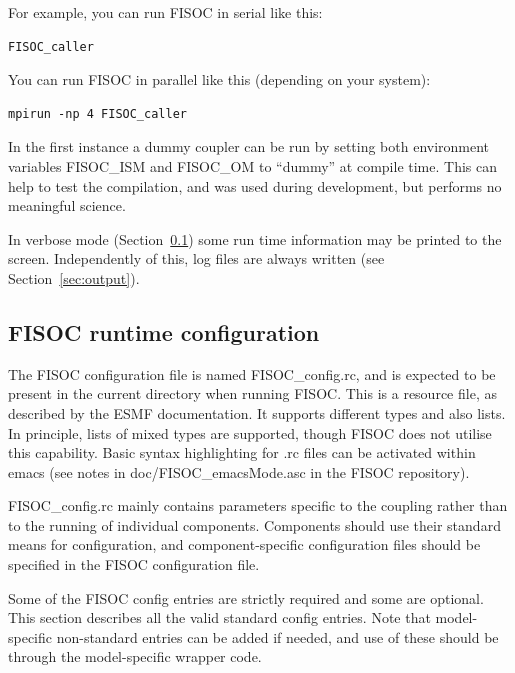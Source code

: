 \documentclass[11pt]{article}
\begin{document}
For example, you can run FISOC in serial like this:
\begin{lstlisting}
FISOC_caller
\end{lstlisting}
You can run FISOC in parallel like this (depending on your system):
\begin{lstlisting}
mpirun -np 4 FISOC_caller
\end{lstlisting}

In the first instance a dummy coupler can be run by setting both environment variables FISOC\_ISM and 
FISOC\_OM to ``dummy'' at compile time.  This can help to test the compilation, and was used during development, 
but performs no meaningful science.  

In verbose mode (Section~\ref{sec:config}) some run time information may be printed to the screen.  
Independently of this, log files are always written (see Section~\ref{sec:output}). 









\subsection{FISOC runtime configuration}
\label{sec:config}

The FISOC configuration file is named FISOC\_config.rc, and is expected to be present 
in the current directory when running FISOC.  
This is a resource file, as described by the 
ESMF documentation.  It supports different types and also lists. 
In principle, lists of mixed types are supported, though FISOC does not utilise this capability.
Basic syntax highlighting for .rc files can be activated within emacs 
(see notes in doc/FISOC\_emacsMode.asc in the FISOC repository).

FISOC\_config.rc mainly contains parameters specific to the coupling rather than to the running of 
individual components.  
Components should use their standard means for configuration, and component-specific configuration files 
should be specified in the FISOC configuration file.

Some of the FISOC config entries are strictly required and some are optional.
This section describes all the valid standard config entries. 
Note that model-specific non-standard entries can be added if needed, and use of these 
should be through the model-specific wrapper code.
\end{document}

